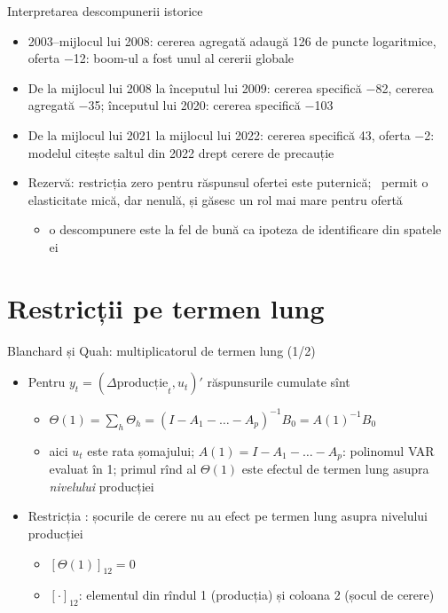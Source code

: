 \begin{frame}{Interpretarea descompunerii istorice}
\itemsize{\small}
\begin{itemize}
    \item 2003--mijlocul lui 2008: cererea agregată adaugă 126 de puncte logaritmice, oferta \ensuremath{-}12: boom-ul a fost unul al cererii globale
    \item De la mijlocul lui 2008 la începutul lui 2009: cererea specifică \ensuremath{-}82, cererea agregată \ensuremath{-}35; începutul lui 2020: cererea specifică \ensuremath{-}103
    \item De la mijlocul lui 2021 la mijlocul lui 2022: cererea specifică 43, oferta \ensuremath{-}2: modelul citește saltul din 2022 drept cerere de precauție
    \item Rezervă: restricția zero pentru răspunsul ofertei este puternică; \ permit o elasticitate mică, dar nenulă, și găsesc un rol mai mare pentru ofertă
    \begin{itemize}
        \item o descompunere este la fel de bună ca ipoteza de identificare din spatele ei
    \end{itemize}
\end{itemize}
\end{frame}


\section{Restricții pe termen lung}

\begin{frame}{Blanchard și Quah: multiplicatorul de termen lung (1/2)}
\itemsize{\small}
\begin{itemize}
    \item Pentru $y_t = (\Delta\text{producție}_t, u_t)'$ răspunsurile cumulate sînt
    \begin{itemize}
        \item $\Theta(1) = \sum_h\Theta_h = (I - A_1 - \dots - A_p)^{-1}B_0 = A(1)^{-1}B_0$
        \item aici $u_t$ este rata șomajului; $A(1) = I - A_1 - \dots - A_p$: polinomul VAR evaluat în 1; primul rînd al $\Theta(1)$ este efectul de termen lung asupra \emph{nivelului} producției
    \end{itemize}
    \item Restricția : șocurile de cerere nu au efect pe termen lung asupra nivelului producției
    \begin{itemize}
        \item $[\Theta(1)]_{12} = 0$
        \item $[\cdot]_{12}$: elementul din rîndul 1 (producția) și coloana 2 (șocul de cerere)
    \end{itemize}
\end{itemize}
\end{frame}

